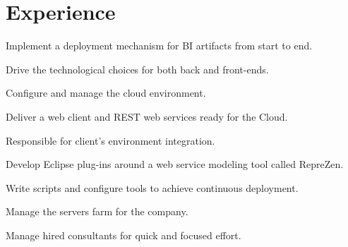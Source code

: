 \documentclass[letterpaper]{deedy-resume} %
\begin{document}
\begin{minipage}[t]{0.66\textwidth} %


\section{Experience}


\vspace{\topsep} %
\begin{tightitemize}
\item Implement a deployment mechanism for BI artifacts from start to end.
\item Drive the technological choices for both back and front-ends.
\item Configure and manage the cloud environment.
\item Deliver a web client and REST web services ready for the Cloud.
\end{tightitemize}

\sectionspace %



\begin{tightitemize}
\item Responsible for client's environment integration.
\item Develop Eclipse plug-ins around a web service modeling tool called RepreZen.
\item Write scripts and configure tools to achieve continuous deployment.
\item Manage the servers farm for the company.
\item Manage hired consultants for quick and focused effort.
\end{tightitemize}

\sectionspace %



\end{minipage}
\end{document}
